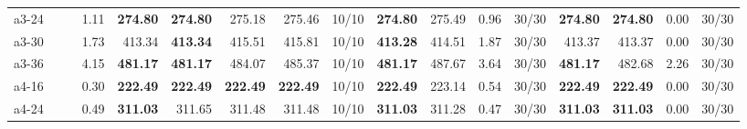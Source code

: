 \documentclass[aspectratio=1610]{beamer}
\begin{document}
\begin{frame}[noframenumbering]
\begin{table}[]
{\begin{tabular}{lrrrrrrrrrrrrrrrr}
a3-24                                          &                                                         & \multicolumn{1}{r|}{}                & 1.11                                                         & \textbf{274.80} & \multicolumn{1}{r|}{{\color[HTML]{FE0000} \textbf{274.80}}} & 275.18          & 275.46                                 & \multicolumn{1}{r|}{10/10} & \textbf{274.80} & 275.49                                 & 0.96   & \multicolumn{1}{r|}{30/30} & \textbf{274.80}    & {\color[HTML]{FE0000} \textbf{274.80}}    & 0.00      & 30/30   \\
a3-30                                          &                                                         & \multicolumn{1}{r|}{}                & 1.73                                                         & 413.34          & \multicolumn{1}{r|}{{\color[HTML]{FE0000} \textbf{413.34}}} & 415.51          & 415.81                                 & \multicolumn{1}{r|}{10/10} & \textbf{413.28} & 414.51                                 & 1.87   & \multicolumn{1}{r|}{30/30} & 413.37             & 413.37                                    & 0.00      & 30/30   \\
a3-36                                          &                                                         & \multicolumn{1}{r|}{}                & 4.15                                                         & \textbf{481.17} & \multicolumn{1}{r|}{{\color[HTML]{FE0000} \textbf{481.17}}} & 484.07          & 485.37                                 & \multicolumn{1}{r|}{10/10} & \textbf{481.17} & 487.67                                 & 3.64   & \multicolumn{1}{r|}{30/30} & \textbf{481.17}    & 482.68                                    & 2.26      & 30/30   \\
a4-16                                          &                                                         & \multicolumn{1}{r|}{}                & 0.30                                                         & \textbf{222.49} & \multicolumn{1}{r|}{{\color[HTML]{FE0000} \textbf{222.49}}} & \textbf{222.49} & {\color[HTML]{FE0000} \textbf{222.49}} & \multicolumn{1}{r|}{10/10} & \textbf{222.49} & 223.14                                 & 0.54   & \multicolumn{1}{r|}{30/30} & \textbf{222.49}    & {\color[HTML]{FE0000} \textbf{222.49}}    & 0.00      & 30/30   \\
a4-24                                          &                                                         & \multicolumn{1}{r|}{}                & 0.49                                                         & \textbf{311.03} & \multicolumn{1}{r|}{311.65}                                 & 311.48          & 311.48                                 & \multicolumn{1}{r|}{10/10} & \textbf{311.03} & 311.28                                 & 0.47   & \multicolumn{1}{r|}{30/30} & \textbf{311.03}    & {\color[HTML]{FE0000} \textbf{311.03}}    & 0.00      & 30/30   \\

\end{tabular}}
\end{table}
\end{frame}
\end{document}
